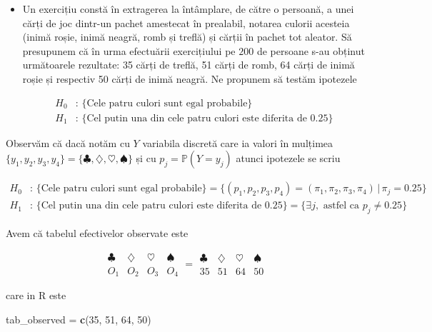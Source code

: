 \documentclass[]{article}
\newenvironment{Shaded}{\begin{snugshade}}{\end{snugshade}}
\newcommand{\KeywordTok}[1]{\textcolor[rgb]{0.13,0.29,0.53}{\textbf{#1}}}
\newcommand{\DecValTok}[1]{\textcolor[rgb]{0.00,0.00,0.81}{#1}}
\newcommand{\StringTok}[1]{\textcolor[rgb]{0.31,0.60,0.02}{#1}}
\newcommand{\NormalTok}[1]{#1}
\newenvironment{frshaded*}{%
  \def\FrameCommand{\fboxrule=\FrameRule\fboxsep=\FrameSep \fcolorbox{framecolor}{shadecolor1}}%
  \MakeFramed {\advance\hsize-\width \FrameRestore}}%
{\endMakeFramed}
\newenvironment{rmdblock}[1]
  {\begin{frshaded*}
  \begin{itemize}
  \renewcommand{\labelitemi}{
    \raisebox{-.7\height}[0pt][0pt]{
      {\setkeys{Gin}{width=2em,keepaspectratio}\texttt{[image: images/icons/\#1]}}
    }
  }
  \item
  }
  {
  \end{itemize}
  \end{frshaded*}
  }
\newenvironment{rmdexercise}
  {\begin{rmdblock}{exercise}}
  {\end{rmdblock}}
\begin{document}
\begin{rmdexercise}
Un exercițiu constă în extragerea la întâmplare, de către o persoană, a
unei cărți de joc dintr-un pachet amestecat în prealabil, notarea
culorii acesteia (inimă roșie, inimă neagră, romb și treflă) și cărții
în pachet tot aleator. Să presupunem că în urma efectuării exercițiului
pe \(200\) de persoane s-au obținut următoarele rezultate: 35 cărți de
treflă, 51 cărți de romb, 64 cărți de inimă roșie și respectiv 50 cărți
de inimă neagră. Ne propunem să testăm ipotezele

\begin{align*}
  H_0&:\,\{\text{Cele patru culori sunt egal probabile}\}\\
  H_1&:\,\{\text{Cel putin una din cele patru culori este diferita de 0.25}\}
\end{align*}
\end{rmdexercise}

Observăm că dacă notăm cu \(Y\) variabila discretă care ia valori în
mulțimea
\(\{y_1,y_2,y_3,y_4\} = \{\clubsuit, \diamondsuit, \heartsuit, \spadesuit\}\)
și cu \(p_j = \mathbb{P}(Y = y_j)\) atunci ipotezele se scriu

\begin{align*}
  H_0&:\,\{\text{Cele patru culori sunt egal probabile}\} = \{(p_1,p_2,p_3,p_4) = (\pi_1, \pi_2, \pi_3, \pi_4) \,|\, \pi_j = 0.25\}\\
  H_1&:\,\{\text{Cel putin una din cele patru culori este diferita de 0.25}\} = \{\exists j, \text{ astfel ca } p_j\neq 0.25\}
\end{align*}

Avem că tabelul efectivelor observate este

\[
\begin{array}{c|c|c|c}
  \clubsuit & \diamondsuit & \heartsuit & \spadesuit \\
  \hline
  O_1 & O_2 & O_3 & O_4
\end{array} 
=
\begin{array}{c|c|c|c}
  \clubsuit & \diamondsuit & \heartsuit & \spadesuit \\
  \hline
  35 & 51 & 64 & 50
\end{array}
\]

care in R este

\begin{Shaded}
\begin{Highlighting}[]
\NormalTok{tab_observed =}\StringTok{ }\KeywordTok{c}\NormalTok{(}\DecValTok{35}\NormalTok{, }\DecValTok{51}\NormalTok{, }\DecValTok{64}\NormalTok{, }\DecValTok{50}\NormalTok{)}
\end{Highlighting}
\end{Shaded}
\end{document}
